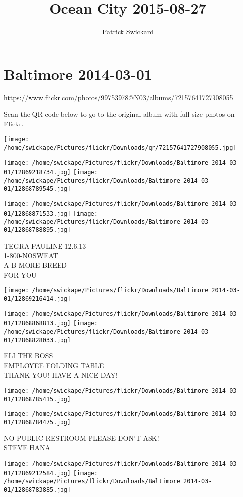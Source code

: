 \documentclass[10pt,letterpaper]{article}
\title{Ocean City 2015-08-27}
\author{Patrick Swickard}
\date{}
\begin{document}
\section*{Baltimore 2014-03-01}

\url{https://www.flickr.com/photos/99753978@N03/albums/72157641727908055}

Scan the QR code below to go to the original album with full-size photos on Flickr:

\texttt{[image: /home/swickape/Pictures/flickr/Downloads/qr/72157641727908055.jpg]}
\pagebreak

\texttt{[image: /home/swickape/Pictures/flickr/Downloads/Baltimore 2014-03-01/12869218734.jpg]}
\texttt{[image: /home/swickape/Pictures/flickr/Downloads/Baltimore 2014-03-01/12868789545.jpg]}

\texttt{[image: /home/swickape/Pictures/flickr/Downloads/Baltimore 2014-03-01/12868871533.jpg]}
\texttt{[image: /home/swickape/Pictures/flickr/Downloads/Baltimore 2014-03-01/12868788895.jpg]}

TEGRA PAULINE 12.6.13\\
1{-}800{-}NOSWEAT\\
A B{-}MORE BREED\\
FOR YOU
\pagebreak

\texttt{[image: /home/swickape/Pictures/flickr/Downloads/Baltimore 2014-03-01/12869216414.jpg]}

\vspace{0.25in}
\texttt{[image: /home/swickape/Pictures/flickr/Downloads/Baltimore 2014-03-01/12868868813.jpg]}
\texttt{[image: /home/swickape/Pictures/flickr/Downloads/Baltimore 2014-03-01/12868828033.jpg]}

ELI THE BOSS\\
EMPLOYEE FOLDING TABLE\\
THANK YOU!  HAVE A NICE DAY!
\pagebreak

\texttt{[image: /home/swickape/Pictures/flickr/Downloads/Baltimore 2014-03-01/12868785415.jpg]}

\vspace{0.25in}
\texttt{[image: /home/swickape/Pictures/flickr/Downloads/Baltimore 2014-03-01/12868784475.jpg]}

NO PUBLIC RESTROOM PLEASE DON'T ASK!\\
STEVE HANA
\pagebreak

\texttt{[image: /home/swickape/Pictures/flickr/Downloads/Baltimore 2014-03-01/12869212584.jpg]}
\texttt{[image: /home/swickape/Pictures/flickr/Downloads/Baltimore 2014-03-01/12868783885.jpg]}
\end{document}
